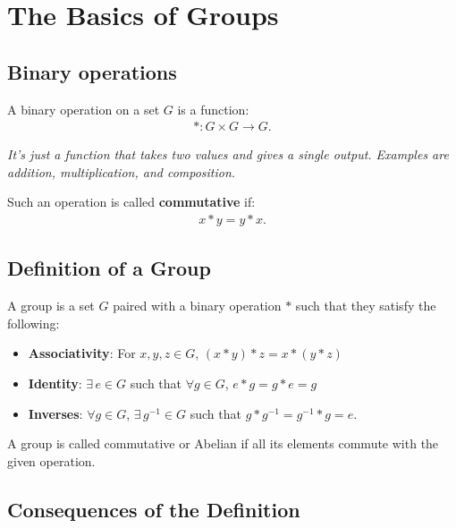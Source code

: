 \documentclass[a4paper, 12pt, twoside]{article}
\begin{document}
\newpage

\section{The Basics of Groups}

\subsection{Binary operations}

A binary operation on a set $G$ is a function:
\begin{align*}
      * : G \times G \to G.
\end{align*}

\textit{It's just a function that takes two values and gives a single
      output. Examples are addition, multiplication, and composition.}

\vspace{\baselineskip}

Such an operation is called \textbf{commutative} if:
\begin{align*}
      x * y = y * x. \tag{$\forall x, y \in G$}
\end{align*}

\subsection{Definition of a Group}

A group is a set $G$ paired with a binary operation $*$ such that they satisfy
the following:

\begin{itemize}
      \item \textbf{Associativity}: For $x, y, z \in G$,
            $(x * y) * z = x * (y * z)$
      \item \textbf{Identity}: $\exists \, e \in G$ such that
            $\forall g \in G$, $e * g = g * e = g$
      \item \textbf{Inverses}: $\forall g \in G$, $\exists \, g^{-1} \in G$
            such that $g * g^{-1} = g^{-1} * g = e$.
\end{itemize}

A group is called commutative or Abelian if all its elements commute with
the given operation.

\subsection{Consequences of the Definition}
\end{document}
